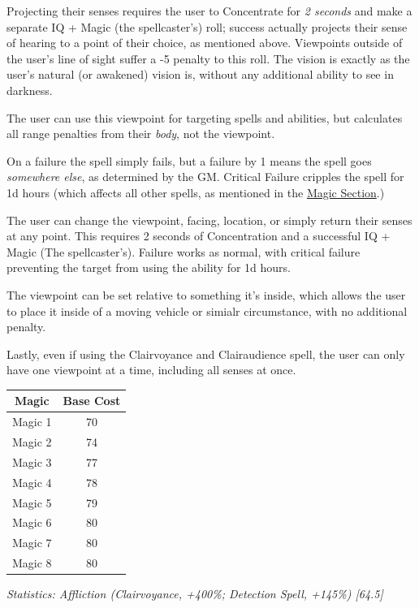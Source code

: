 \begin{multicols*}{3}
	Projecting their senses requires the user to Concentrate for \textit{2 seconds} and make a separate IQ + Magic (the spellcaster's) roll; success actually projects their sense of hearing to a point of their choice, as mentioned above. Viewpoints outside of the user's line of sight suffer a -5 penalty to this roll. The vision is exactly as the user's natural (or awakened) vision is, without any additional ability to see in darkness.
	
	The user can use this viewpoint for targeting spells and abilities, but calculates all range penalties from their \textit{body}, not the viewpoint.
	
	On a failure the spell simply fails, but a failure by 1 means the spell goes \textit{somewhere else}, as determined by the GM. Critical Failure cripples the spell for 1d hours (which affects all other spells, as mentioned in the \hyperref[magic]{Magic Section}.)
	
	The user can change the viewpoint, facing, location, or simply return their senses at any point. This requires 2 seconds of Concentration and a successful IQ + Magic (The spellcaster's). Failure works as normal, with critical failure preventing the target from using the ability for 1d hours.
	
	The viewpoint can be set relative to something it's inside, which allows the user to place it inside of a moving vehicle or simialr circumstance, with no additional penalty.
	
	Lastly, even if using the Clairvoyance and Clairaudience spell, the user can only have one viewpoint at a time, including all senses at once.
		
	\begin{center}
		\begin{tabular}{|c|c|}
			\hline
			Magic & Base Cost \\
			\hline
			\hline
			Magic 1 & 70 \\
			Magic 2 & 74 \\
			Magic 3 & 77 \\
			Magic 4 & 78 \\
			Magic 5 & 79 \\
			Magic 6 & 80 \\
			Magic 7 & 80 \\
			Magic 8 & 80 \\
			\hline
		\end{tabular}
	\end{center}
	
	\textcolor{OliveGreen}{\textit{ Statistics: Affliction (Clairvoyance, +400\%; Detection Spell, +145\%) [64.5]}}
	

\end{multicols*}
